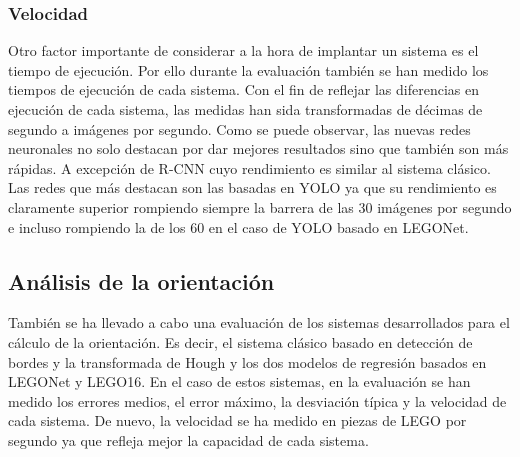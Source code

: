 {\subsubsection*{Velocidad}
Otro factor importante de considerar a la hora de implantar un sistema es el tiempo de ejecución. Por ello durante la evaluación también se han medido los tiempos de ejecución de cada sistema. Con el fin de reflejar las diferencias en ejecución de cada sistema, las medidas han sida transformadas de décimas de segundo a imágenes por segundo. Como se puede observar, las nuevas redes neuronales no solo destacan por dar mejores resultados sino que también son más rápidas. A excepción de R-CNN cuyo rendimiento es similar al sistema clásico. Las redes que más destacan son las basadas en YOLO ya que su rendimiento es claramente superior rompiendo siempre la barrera de las 30 imágenes por segundo e incluso rompiendo la de los 60 en el caso de YOLO basado en LEGONet.


\subsection*{Análisis de la orientación}
También se ha llevado a cabo una evaluación de los sistemas desarrollados para el cálculo de la orientación. Es decir, el sistema clásico basado en detección de bordes y la transformada de Hough y los dos modelos de regresión basados en LEGONet y LEGO16. En el caso de estos sistemas, en la evaluación se han medido los errores medios, el error máximo, la desviación típica y la velocidad de cada sistema. De nuevo, la velocidad se ha medido en piezas de LEGO por segundo ya que refleja mejor la capacidad de cada sistema.

}
